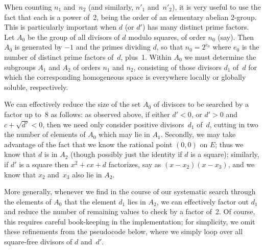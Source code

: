 When counting $n_1$ and~$n_2$ (and similarly, $n'_1$ and~$n'_2$), it
is very useful to use the fact that each is a power of~2, being the
order of an elementary abelian $2$-group.  This is particularly
important when $d$ (or $d'$) has many distinct prime factors.  Let
$A_0$ be the group of all divisors of $d$ modulo squares, of order
$n_0$ (say).  Then $A_0$ is generated by $-1$ and the primes dividing
$d$, so that $n_0=2^{e_0}$ where $e_0$ is the number of distinct
prime factors of~$d$, plus~1.  Within $A_0$ we must determine the
subgroups $A_1$ and $A_2$ of orders $n_1$ and $n_2$, consisting of
those divisors $d_1$ of~$d$ for which the corresponding homogeneous
space is everywhere locally or globally soluble, respectively.

We can effectively reduce the size of the set $A_0$ of divisors to be
searched by a factor up to~$8$ as follows: as observed above, if
either $d'<0$, or $d'>0$ and $c+\sqrt{d'}<0$, then we need only
consider positive divisors~$d_1$ of~$d$, cutting in two the number of
elements of $A_0$ which may lie in $A_1$.  Secondly, we may take
advantage of the fact that we know the rational point $(0,0)$ on $E$;
thus we know that $d$ is in $A_2$ (though possibly just the identity
if $d$ is a square); similarly, if $d'$ is a square then $x^2+cx+d$
factorizes, say as $(x-x_2)(x-x_3)$, and we know that $x_2$ and~$x_3$
also lie in $A_2$.

More generally, whenever we find in the course of our systematic
search through the elements of $A_0$ that the element $d_1$ lies in
$A_2$, we can effectively factor out $d_1$ and reduce the number of
remaining values to check by a factor of~2.  Of course, this requires
careful book-keeping in the implementation; for simplicity, we omit
these refinements from the pseudocode below, where we simply loop over
all square-free divisors of $d$ and~$d'$.

